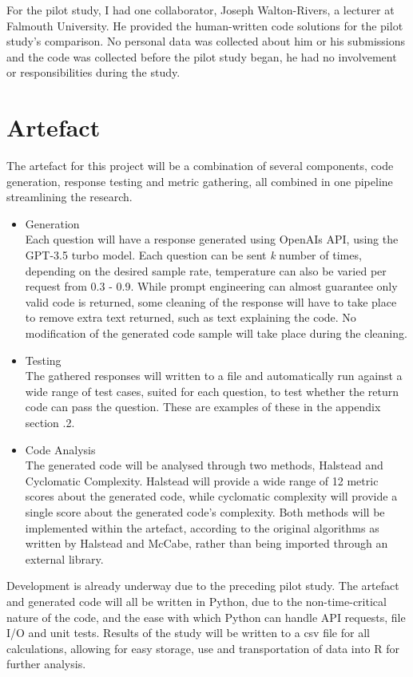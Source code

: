 \documentclass[manuscript,screen,review,sigconf]{acmart}
\begin{document}
For the pilot study, I had one collaborator, Joseph Walton-Rivers, a lecturer at Falmouth University. He provided the human-written code solutions for the pilot study's comparison. No personal data was collected about him or his submissions and the code was collected before the pilot study began, he had no involvement or responsibilities during the study.

\section{Artefact}
The artefact for this project will be a combination of several components, code generation, response testing and metric gathering, all combined in one pipeline streamlining the research.
\begin{itemize}
    \item Generation\\
    Each question will have a response generated using OpenAIs API, using the GPT-3.5 turbo model. Each question can be sent \textit{k} number of times, depending on the desired sample rate, temperature can also be varied per request from 0.3 - 0.9. While prompt engineering can almost guarantee only valid code is returned, some cleaning of the response will have to take place to remove extra text returned, such as text explaining the code. No modification of the generated code sample will take place during the cleaning.
    \item Testing\\
    The gathered responses will written to a file and automatically run against a wide range of test cases, suited for each question, to test whether the return code can pass the question. These are examples of these in the appendix section .2.
    \item Code Analysis\\
    The generated code will be analysed through two methods, Halstead and Cyclomatic Complexity. Halstead will provide a wide range of 12 metric scores about the generated code, while cyclomatic complexity will provide a single score about the generated code's complexity. Both methods will be implemented within the artefact, according to the original algorithms as written by Halstead and McCabe, rather than being imported through an external library.
\end{itemize}

Development is already underway due to the preceding pilot study. The artefact and generated code will all be written in Python, due to the non-time-critical nature of the code, and the ease with which Python can handle API requests, file I/O and unit tests. Results of the study will be written to a csv file for all calculations, allowing for easy storage, use and transportation of data into R for further analysis.
\end{document}
